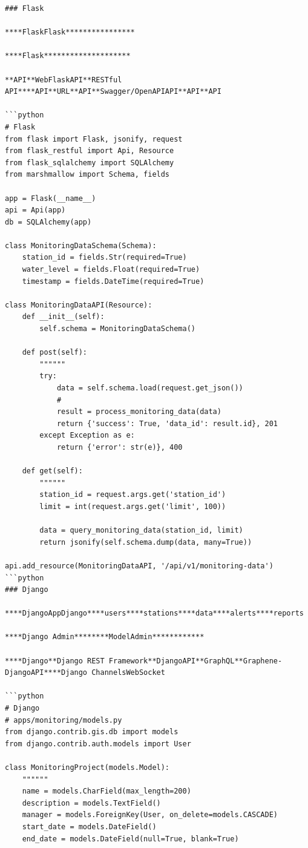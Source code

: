 \begin{verbatim}
### Flask

****FlaskFlask****************

****Flask********************

**API**WebFlaskAPI**RESTful API****API**URL**API**Swagger/OpenAPIAPI**API**API

```python
# Flask
from flask import Flask, jsonify, request
from flask_restful import Api, Resource
from flask_sqlalchemy import SQLAlchemy
from marshmallow import Schema, fields

app = Flask(__name__)
api = Api(app)
db = SQLAlchemy(app)

class MonitoringDataSchema(Schema):
    station_id = fields.Str(required=True)
    water_level = fields.Float(required=True)
    timestamp = fields.DateTime(required=True)

class MonitoringDataAPI(Resource):
    def __init__(self):
        self.schema = MonitoringDataSchema()
    
    def post(self):
        """"""
        try:
            data = self.schema.load(request.get_json())
            # 
            result = process_monitoring_data(data)
            return {'success': True, 'data_id': result.id}, 201
        except Exception as e:
            return {'error': str(e)}, 400
    
    def get(self):
        """"""
        station_id = request.args.get('station_id')
        limit = int(request.args.get('limit', 100))
        
        data = query_monitoring_data(station_id, limit)
        return jsonify(self.schema.dump(data, many=True))

api.add_resource(MonitoringDataAPI, '/api/v1/monitoring-data')
```python
### Django

****DjangoAppDjango****users****stations****data****alerts****reports

****Django Admin********ModelAdmin************

****Django**Django REST Framework**DjangoAPI**GraphQL**Graphene-DjangoAPI****Django ChannelsWebSocket

```python
# Django
# apps/monitoring/models.py
from django.contrib.gis.db import models
from django.contrib.auth.models import User

class MonitoringProject(models.Model):
    """"""
    name = models.CharField(max_length=200)
    description = models.TextField()
    manager = models.ForeignKey(User, on_delete=models.CASCADE)
    start_date = models.DateField()
    end_date = models.DateField(null=True, blank=True)
    

\end{verbatim}
